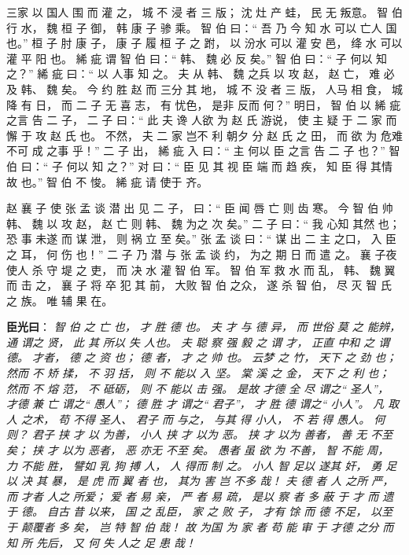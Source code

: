 \documentclass[UTF8,a4paper,8pt]{ctexbook}
\begin{document}
				  三家 以 国人 围 而 灌 之， 城 不 浸 者 三 版； 沈 灶 产 蛙， 民 无 叛意。 智 伯 行 水， 魏 桓 子 御， 韩 康 子 骖 乘。 智 伯 曰：“ 吾 乃 今 知 水 可以 亡人 国 也。” 桓 子 肘 康 子， 康 子 履 桓 子 之 跗， 以 汾水 可以 灌 安 邑， 绛 水 可以 灌 平 阳 也。 絺 疵 谓 智 伯 曰：“ 韩、 魏 必 反 矣。” 智 伯 曰：“ 子 何以 知 之？” 絺 疵 曰：“ 以 人事 知 之。 夫 从 韩、 魏 之兵 以 攻 赵， 赵 亡， 难 必 及 韩、 魏 矣。 今 约 胜 赵 而 三分 其 地， 城 不 没 者 三 版， 人马 相 食， 城 降 有 日， 而 二 子 无 喜 志， 有 忧色， 是非 反而 何？” 明日， 智 伯 以 絺 疵 之言 告 二 子， 二 子 曰：“ 此 夫 谗 人欲 为 赵 氏 游说， 使 主 疑 于 二 家 而 懈 于 攻 赵 氏 也。 不然， 夫 二 家 岂不 利 朝夕 分 赵 氏 之 田， 而 欲 为 危难 不可 成 之事 乎！” 二 子 出， 絺 疵 入 曰：“ 主 何以 臣 之言 告 二 子 也？” 智 伯 曰：“ 子 何以 知 之？” 对 曰：“ 臣 见 其 视 臣 端 而 趋 疾， 知 臣 得 其情 故 也。” 智 伯 不 悛。 絺 疵 请 使于 齐。
				  
				  赵 襄 子 使 张 孟 谈 潜 出 见 二 子， 曰：“ 臣 闻 唇 亡 则 齿 寒。 今 智 伯 帅 韩、 魏 以 攻 赵， 赵 亡 则 韩、 魏 为之 次 矣。” 二 子 曰：“ 我 心知 其然 也； 恐 事 未遂 而 谋 泄， 则 祸 立 至 矣。” 张 孟 谈 曰：“ 谋 出 二 主 之口， 入 臣 之 耳， 何 伤 也！” 二 子 乃 潜 与 张 孟 谈 约， 为之 期 日 而 遣 之。 襄 子夜 使人 杀 守 堤 之 吏， 而 决 水 灌 智 伯 军。 智 伯 军 救 水 而 乱， 韩、 魏 翼 而 击 之， 襄 子 将 卒 犯 其 前， 大败 智 伯 之众， 遂 杀 智 伯， 尽 灭 智 氏 之 族。 唯 辅 果 在。 
				  
				  \textbf{臣光曰}： \textit{智 伯 之 亡 也， 才 胜 德 也。 夫 才 与 德 异， 而 世俗 莫 之 能辨， 通 谓之 贤， 此 其 所以 失 人也。 夫 聪 察 强 毅 之 谓 才， 正直 中和 之 谓 德。 才者， 德 之 资 也； 德 者， 才 之 帅 也。 云梦 之 竹， 天下 之 劲 也； 然而 不 矫 揉， 不 羽 括， 则 不 能以 入 坚。 棠 溪 之 金， 天下 之 利 也； 然而 不 熔 范， 不 砥砺， 则 不 能以 击 强。 是故 才德 全 尽 谓之“ 圣人”， 才德 兼 亡 谓之“ 愚人”； 德 胜 才 谓之“ 君子”， 才 胜 德 谓之“ 小人”。 凡 取 人 之术， 苟 不得 圣人、 君子 而 与之， 与其 得 小人， 不 若 得 愚人。 何 则？ 君子 挟 才 以 为善， 小人 挟 才 以为 恶。 挟 才 以为 善者， 善 无 不至 矣； 挟 才 以为 恶者， 恶 亦无 不至 矣。 愚者 虽 欲 为 不善， 智 不能 周， 力 不能 胜， 譬如 乳 狗 搏 人， 人 得而 制 之。 小人 智 足以 遂其 奸， 勇 足以 决 其 暴， 是 虎 而 翼 者 也， 其为 害 岂 不多 哉！ 夫 德 者 人 之所 严， 而 才者 人之 所爱； 爱 者 易 亲， 严 者 易 疏， 是以 察 者 多 蔽 于 才 而 遗 于 德。 自古 昔 以来， 国 之 乱臣， 家 之 败 子， 才有 馀 而 德 不足， 以至于 颠覆者 多 矣， 岂 特 智 伯 哉！ 故 为国 为 家 者 苟 能 审 于 才德 之分 而知 所 先后， 又 何 失 人之 足 患 哉！}
				  
\end{document}
